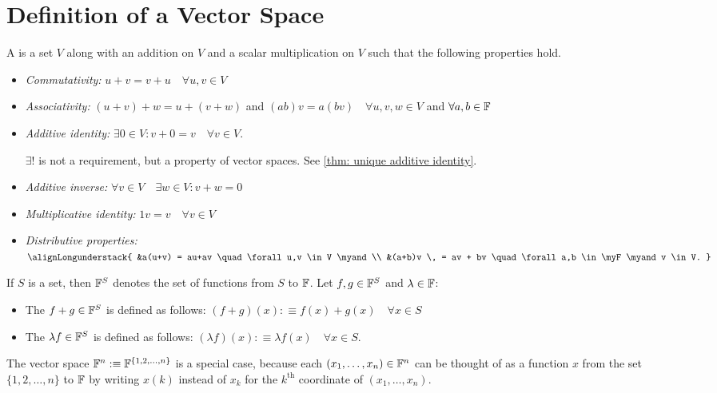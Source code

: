 \section{Definition of a Vector Space}

\setcounter{thm}{19}
\begin{mydef} 
  A  is a set $V$ along with an addition on $V$ and a scalar multiplication on $V$ such that the following properties hold.
  \begin{itemize}
    \item \emph{Commutativity:}
    $ u+v = v+u \quad \forall u,v \in V$
    \item \emph{Associativity:}
    $(u+v)+w=u+(v+w)$ and $(ab)v=a(bv) \quad \forall u,v,w \in V$ and $\forall a,b \in \mathbb{F}$
    \item \emph{Additive identity:}
    $\exists 0\in V:v+0=v \quad \forall v\in V$.

    $\exists!$ is not a requirement, but a property of vector spaces. See \ref{thm: unique additive identity}.
    \item \emph{Additive inverse:}
    $\forall v\in V \quad \exists w\in V: v+w=0$
    \item \emph{Multiplicative identity:}
    $1v = v \quad \forall v\in V$
    \item \emph{Distributive properties:}
    $
      \alignLongunderstack{
        &a(u+v) = au+av \quad \forall u,v \in V \myand  \\
        &(a+b)v \, = av + bv \quad \forall a,b \in \myF \myand v \in V.
      }
    $
  \end{itemize}
\end{mydef}

\setcounter{thm}{23}
\begin{mydef} 
  If $S$ is a set, then $\mathbb{F}^S$ denotes the set of functions from $S$ to $\mathbb{F}$. Let $f, g \in \mathbb{F}^{S}$ and $\lambda \in \mathbb{F}$:
  \begin{itemize}
    \item The  $f+g \in \mathbb{F}^{S}$ is defined as follows: $(f+g)(x) :\equiv f(x)+ g(x) \quad \forall x\in S$
    \item The  $\lambda f \in \mathbb{F}^{S}$ is defined as follows: $(\lambda f)(x) :\equiv \lambda f(x) \quad \forall x \in S$.
  \end{itemize}
  The vector space $\mathbb{F}^{n} :\equiv \mathbb{F}^{\{1,2,\dots,n\}}$ is a special case, because each $(x_1, \dots, x_n) \in \mathbb{F}^{n}$ can be thought of as a function $x$ from the set $\{1, 2, \dots, n\}$ to $\mathbb{F}$ by writing $x(k)$ instead of $x_k$ for the $k^{\text{th}}$ coordinate of $(x_1, \dots, x_n)$.
\end{mydef}

